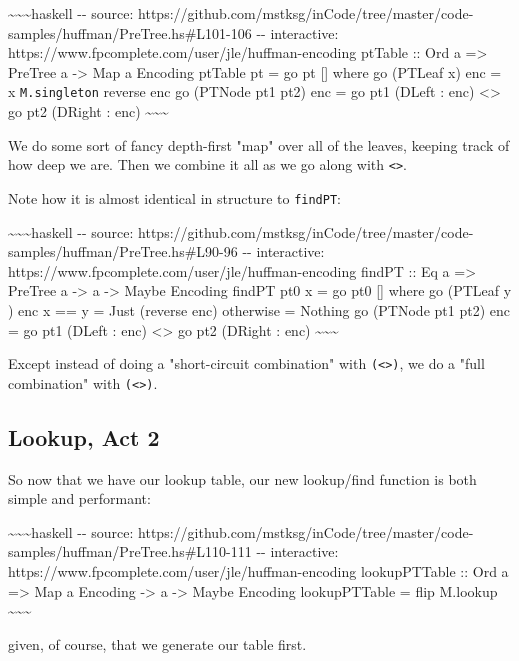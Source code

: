 \documentclass[]{article}
\begin{document}
\textasciitilde{}\textasciitilde{}\textasciitilde{}haskell -\/- source:
https://github.com/mstksg/inCode/tree/master/code-samples/huffman/PreTree.hs\#L101-106
-\/- interactive: https://www.fpcomplete.com/user/jle/huffman-encoding ptTable
:: Ord a =\textgreater{} PreTree a -\textgreater{} Map a Encoding ptTable pt =
go pt {[}{]} where go (PTLeaf x) enc = x \texttt{M.singleton} reverse enc go
(PTNode pt1 pt2) enc = go pt1 (DLeft : enc) \textless{}\textgreater{} go pt2
(DRight : enc) \textasciitilde{}\textasciitilde{}\textasciitilde{}

We do some sort of fancy depth-first "map" over all of the leaves, keeping track
of how deep we are. Then we combine it all as we go along with
\texttt{\textless{}\textgreater{}}.

Note how it is almost identical in structure to \texttt{findPT}:

\textasciitilde{}\textasciitilde{}\textasciitilde{}haskell -\/- source:
https://github.com/mstksg/inCode/tree/master/code-samples/huffman/PreTree.hs\#L90-96
-\/- interactive: https://www.fpcomplete.com/user/jle/huffman-encoding findPT ::
Eq a =\textgreater{} PreTree a -\textgreater{} a -\textgreater{} Maybe Encoding
findPT pt0 x = go pt0 {[}{]} where go (PTLeaf y ) enc \textbar{} x == y = Just
(reverse enc) \textbar{} otherwise = Nothing go (PTNode pt1 pt2) enc = go pt1
(DLeft : enc) \textless{}\textbar{}\textgreater{} go pt2 (DRight : enc)
\textasciitilde{}\textasciitilde{}\textasciitilde{}

Except instead of doing a "short-circuit combination" with
\texttt{(\textless{}\textbar{}\textgreater{})}, we do a "full combination" with
\texttt{(\textless{}\textgreater{})}.

\subsection{Lookup, Act 2}

So now that we have our lookup table, our new lookup/find function is both
simple and performant:

\textasciitilde{}\textasciitilde{}\textasciitilde{}haskell -\/- source:
https://github.com/mstksg/inCode/tree/master/code-samples/huffman/PreTree.hs\#L110-111
-\/- interactive: https://www.fpcomplete.com/user/jle/huffman-encoding
lookupPTTable :: Ord a =\textgreater{} Map a Encoding -\textgreater{} a
-\textgreater{} Maybe Encoding lookupPTTable = flip M.lookup
\textasciitilde{}\textasciitilde{}\textasciitilde{}

given, of course, that we generate our table first.
\end{document}
